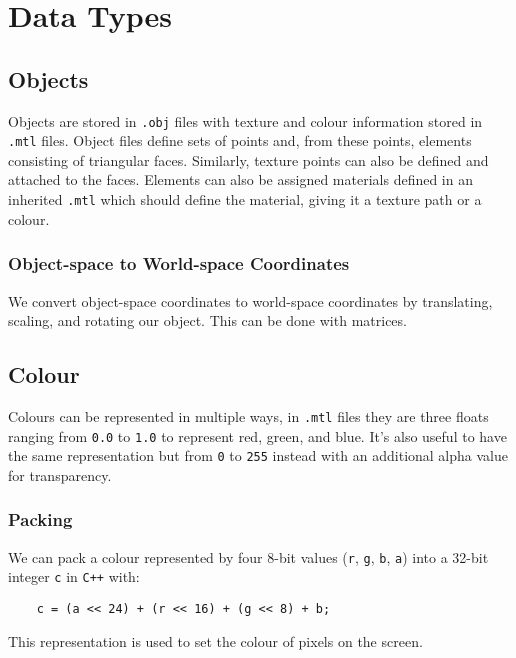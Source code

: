 \section{Data Types}

\subsection{Objects}

Objects are stored in \texttt{.obj} files with texture and colour information
stored in \texttt{.mtl} files. Object files define sets of points and, from these
points, elements consisting of triangular faces. Similarly, texture points
can also be defined and attached to the faces. Elements can also be assigned
materials defined in an inherited \texttt{.mtl} which should define the material,
giving it a texture path or a colour.

\subsubsection{Object-space to World-space Coordinates}

We convert object-space coordinates to world-space coordinates by translating,
scaling, and rotating our object. This can be done with matrices.

\subsection{Colour}

Colours can be represented in multiple ways, in \texttt{.mtl} files they are
three floats ranging from \texttt{0.0} to \texttt{1.0} to represent red, green,
and blue. It's also useful to have the same representation but from \texttt{0}
to \texttt{255} instead with an additional alpha value for transparency.

\subsubsection{Packing}

We can pack a colour represented by four 8-bit values 
(\texttt{r}, \texttt{g}, \texttt{b}, \texttt{a}) into a 32-bit 
integer \texttt{c} in \texttt{C++} with: \begin{lstlisting}
    c = (a << 24) + (r << 16) + (g << 8) + b;
\end{lstlisting} This representation is used to set the colour of pixels on
the screen.